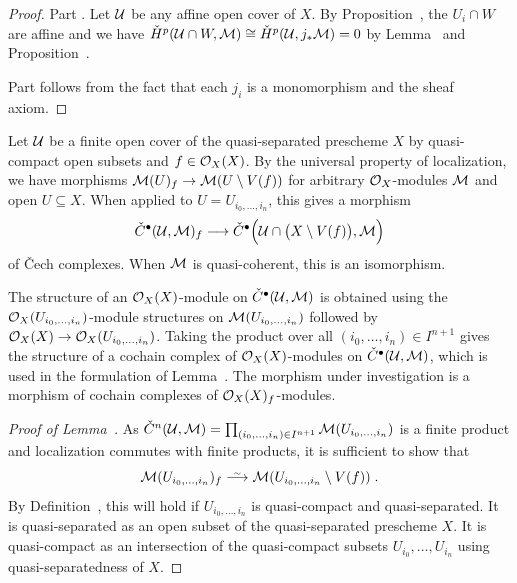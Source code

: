 \documentclass[a4paper,parskip=half,numbers=enddot, DIV=12]{scrreprt}
\newcommand{\vC}{\v{C}}
\begin{document}
\begin{proof}
	Part . Let $\mathcal{U}$ be any affine open cover of $X$. By Proposition~, the $U_i\cap W$ are affine and we have $\check{H}^p(\mathcal{U}\cap W,\mathcal{M})\cong \check{H}^p(\mathcal{U},j_*\mathcal{M})=0$ by Lemma~ and Proposition~.
	
	Part  follows from the fact that each $j_i$ is a monomorphism and the sheaf axiom.
\end{proof}
\begin{lem}
	Let $\mathcal{U}$ be a finite open cover of the quasi-separated prescheme $X$ by quasi-compact open subsets and $f\in\mathcal{O}_X(X)$. By the universal property of localization, we have morphisms $\Mm(U)_f\morphism\Mm(U\setminus V(f))$ for arbitrary $\mathcal{O}_X$-modules $\mathcal{M}$ and open $U\subseteq X$. When applied to $U=U_{i_0,\ldots,i_n}$, this gives a morphism
	\begin{align*}
		\check{C}^\bullet (\Uu,\Mm)_f\morphism\check{C}^\bullet \Big(\Uu\cap\big(X\setminus V(f)\big),\Mm\Big)
	\end{align*}
	of \vC ech complexes. When $\mathcal{M}$ is quasi-coherent, this is an isomorphism.
\end{lem}
\begin{rem*}
	The structure of an $\mathcal{O}_X(X)$-module on $\check{C}^\bullet (\mathcal{U},\mathcal{M})$ is obtained using the $\mathcal{O}_X(U_{i_0,\ldots,i_n})$-module structures on $\mathcal{M}(U_{i_0,\ldots,i_n})$ followed by $\Oo_X(X)\morphism \Oo_X(U_{i_0,\ldots,i_n})$. Taking the product over all $(i_0,\ldots,i_n)\in I^{n+1}$ gives the structure of a cochain complex of $\mathcal{O}_X(X)$-modules on $\check{C}^\bullet (\mathcal{U},\mathcal{M})$, which is used in the formulation of Lemma~. The morphism under investigation is a morphism of cochain complexes  of $\mathcal{O}_X(X)_f$-modules.
\end{rem*}
\begin{proof}[Proof of Lemma~]
	As $\check{C}^n(\mathcal{U},\mathcal{M})=\prod_{(i_0,\ldots,i_n)\in I^{n+1}}\mathcal{M}(U_{i_0,\ldots,i_n})$ is a finite product and localization commutes with finite products, it is sufficient to show that
	\begin{align*}
		\Mm(U_{i_0,\ldots,i_n})_f\isomorphism\Mm(U_{i_0,\ldots,i_n}\setminus V(f))\;.
	\end{align*}
	By Definition~, this will hold if $U_{i_0,\ldots,i_n}$ is quasi-compact and quasi-separated. It is quasi-separated as an open subset of the quasi-separated prescheme $X$. It is quasi-compact as an intersection of the quasi-compact subsets $U_{i_0},\ldots,U_{i_n}$ using quasi-separatedness of $X$.
\end{proof}
\end{document}
